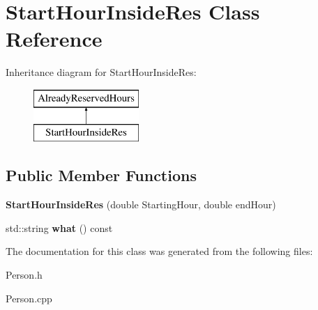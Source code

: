 \hypertarget{class_start_hour_inside_res}{}\section{Start\+Hour\+Inside\+Res Class Reference}
\label{class_start_hour_inside_res}
Inheritance diagram for Start\+Hour\+Inside\+Res\+:\begin{figure}[H]
\begin{center}
\leavevmode
\includegraphics[height=2.000000cm]{class_start_hour_inside_res}
\end{center}
\end{figure}
\subsection*{Public Member Functions}
\begin{DoxyCompactItemize}
\item 
\mbox{\label{class_start_hour_inside_res_a6c05984e1473ec49ce644ecfaecab8fc}} 
{\bfseries Start\+Hour\+Inside\+Res} (double Starting\+Hour, double end\+Hour)
\item 
\mbox{\label{class_start_hour_inside_res_a90b45cf2a2d4f0adcf7d9f650bee1574}} 
std\+::string {\bfseries what} () const
\end{DoxyCompactItemize}


The documentation for this class was generated from the following files\+:\begin{DoxyCompactItemize}
\item 
Person.\+h\item 
Person.\+cpp\end{DoxyCompactItemize}
